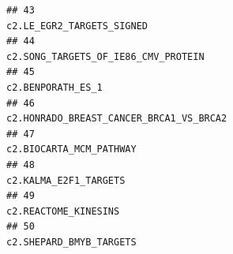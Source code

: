\documentclass{article}\usepackage[]{graphicx}\usepackage[]{color}
\makeatletter
\newenvironment{kframe}{%
 \def\at@end@of@kframe{}%
 \ifinner\ifhmode%
  \def\at@end@of@kframe{\end{minipage}}%
  \begin{minipage}{\columnwidth}%
 \fi\fi%
 \def\FrameCommand##1{\hskip\@totalleftmargin \hskip-\fboxsep
 \colorbox{shadecolor}{##1}\hskip-\fboxsep
     \hskip-\linewidth \hskip-\@totalleftmargin \hskip\columnwidth}%
 \MakeFramed {\advance\hsize-\width
   \@totalleftmargin\z@ \linewidth\hsize
   \@setminipage}}%
 {\par\unskip\endMakeFramed%
 \at@end@of@kframe}
\newenvironment{knitrout}{}{} %
\makeatother
\begin{document}
\begin{knitrout}
\begin{kframe}
\begin{verbatim}
## 43                                                                                                                                                                                                                                                                                                                              c2.LE_EGR2_TARGETS_SIGNED
## 44                                                                                                                                                                                                                                                                                                                    c2.SONG_TARGETS_OF_IE86_CMV_PROTEIN
## 45                                                                                                                                                                                                                                                                                                                                      c2.BENPORATH_ES_1
## 46                                                                                                                                                                                                                                                                                                                c2.HONRADO_BREAST_CANCER_BRCA1_VS_BRCA2
## 47                                                                                                                                                                                                                                                                                                                                c2.BIOCARTA_MCM_PATHWAY
## 48                                                                                                                                                                                                                                                                                                                                  c2.KALMA_E2F1_TARGETS
## 49                                                                                                                                                                                                                                                                                                                                   c2.REACTOME_KINESINS
## 50                                                                                                                                                                                                                                                                                                                                c2.SHEPARD_BMYB_TARGETS

\end{verbatim}
\end{kframe}
\end{knitrout}
\end{document}
